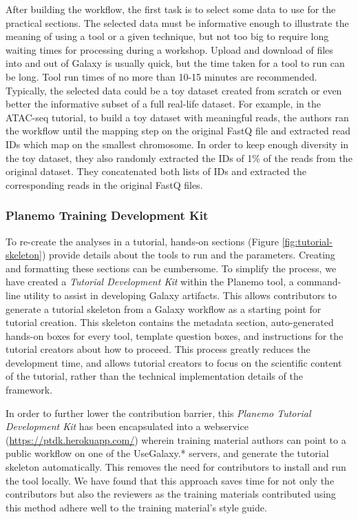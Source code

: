 \documentclass[10pt,letterpaper]{article}
\begin{document}
After building the workflow, the first task is to select some data to use for the practical sections. The selected data must be informative enough to illustrate the meaning of using a tool or a given technique, but not too big to require long waiting times for processing during a workshop. Upload and download of files into and out of Galaxy is usually quick, but the time taken for a tool to run can be long. Tool run times of no more than 10-15 minutes are recommended. Typically, the selected data could be a toy dataset created from scratch or even better the informative subset of a full real-life dataset. For example, in the ATAC-seq tutorial, to build a toy dataset with meaningful reads, the authors ran the workflow until the mapping step on the original FastQ file and extracted read IDs which map on the smallest chromosome. In order to keep enough diversity in the toy dataset, they also randomly extracted the IDs of 1\% of the reads from the original dataset. They concatenated both lists of IDs and extracted the corresponding reads in the original FastQ files.

\subsubsection*{Planemo Training Development Kit}

To re-create the analyses in a tutorial, hands-on sections (Figure \ref{fig:tutorial-skeleton}) provide details about the tools to run and the parameters. Creating and formatting these sections can be cumbersome. To simplify the process, we have created a \emph{Tutorial Development Kit} within the Planemo tool, a command-line utility to assist in developing Galaxy artifacts. This allows contributors to generate a tutorial skeleton from a Galaxy workflow as a starting point for tutorial creation.
This skeleton contains the metadata section, auto-generated hands-on boxes for every tool, template question boxes, and instructions for the tutorial creators about how to proceed. 
This process greatly reduces the development time, and allows tutorial creators to focus on the scientific content of the tutorial, rather than the technical implementation details of the framework.

In order to further lower the contribution barrier, this \emph{Planemo Tutorial Development Kit} has been encapsulated into a webservice (\url{https://ptdk.herokuapp.com/}) wherein training material authors can point to a public workflow on one of the UseGalaxy.* servers, and generate the tutorial skeleton automatically.
This removes the need for contributors to install and run the tool locally.
 We have found that this approach saves time for not only the contributors but also the reviewers as the training materials contributed using this method adhere well to the training material’s style guide.
\end{document}
